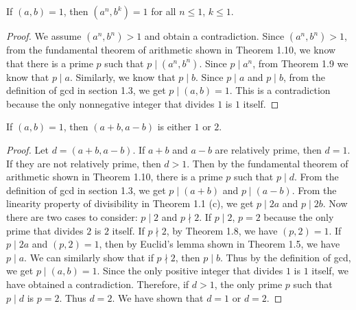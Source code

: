 \begin{exercise}{1.3}
  If \( (a, b) = 1 \), then \( (a^n, b^k) = 1 \) for all \( n \le 1
  \), \( k \le 1 \).
\end{exercise}

\begin{proof}
  We assume \( (a^n, b^n) > 1 \) and obtain a contradiction. Since \(
  (a^n, b^n) > 1 \), from the fundamental theorem of arithmetic shown
  in Theorem 1.10, we know that there is a prime \( p \) such that \(
  p \mid (a^n, b^n) \). Since \( p \mid a^n \), from Theorem 1.9 we
  know that \( p \mid a \). Similarly, we know that \( p \mid b \).
  Since \( p \mid a \) and \( p \mid b \), from the definition of gcd
  in section 1.3, we get \( p \mid (a, b) = 1 \). This is a
  contradiction because the only nonnegative integer that divides \( 1
  \) is \( 1 \) itself.
\end{proof}


\begin{exercise}{1.4}
  If \( (a, b) = 1 \), then \( (a + b, a - b) \) is either \( 1 \) or
  \( 2 \).
\end{exercise}

\begin{proof}
  Let \( d = (a + b, a - b) \). If \( a + b \) and \( a - b \) are
  relatively prime, then \( d = 1 \). If they are not relatively
  prime, then \( d > 1 \). Then by the fundamental theorem of
  arithmetic shown in Theorem 1.10, there is a prime \( p \) such that
  \( p \mid d \). From the definition of gcd in section 1.3, we get \(
  p \mid (a + b) \) and \( p \mid (a - b) \). From the linearity
  property of divisibility in Theorem 1.1 (c), we get \( p \mid 2a \)
  and \( p \mid 2b \). Now there are two cases to consider: \( p \mid
  2 \) and \( p \nmid 2 \). If \( p \mid 2 \), \( p = 2 \) because the
  only prime that divides \( 2 \) is \( 2 \) itself. If \( p \nmid 2
  \), by Theorem 1.8, we have \( (p, 2) = 1 \). If \( p \mid 2a \) and
  \( (p, 2) = 1 \), then by Euclid's lemma shown in Theorem 1.5, we
  have \( p \mid a \). We can similarly show that if \( p \nmid 2 \),
  then \( p \mid b \). Thus by the definition of gcd, we get \( p \mid
  (a, b) = 1 \). Since the only positive integer that divides \( 1 \)
  is \( 1 \) itself, we have obtained a contradiction. Therefore, if
  \( d > 1 \), the only prime \( p \) such that \( p \mid d \) is \( p
  = 2 \). Thus \( d = 2 \). We have shown that \( d = 1 \) or \( d = 2
  \).
\end{proof}

